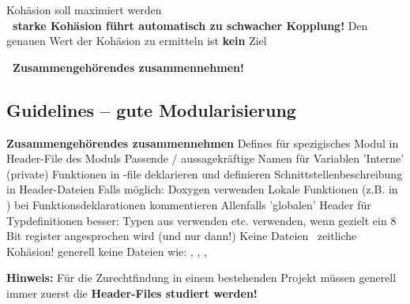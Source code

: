 \begin{outline}
    \1 Kohäsion soll maximiert werden \\
        \textbf{ \textrightarrow\ starke Kohäsion führt automatisch zu schwacher Kopplung!}
    \1 Den genauen Wert der Kohäsion zu ermitteln ist \textbf{kein} Ziel
\end{outline}

\vspace{0.1cm}

\textbf{ \textrightarrow\ Zusammengehörendes zusammennehmen!}


\subsection{Guidelines -- gute Modularisierung}

\begin{outline}
    \1 \textbf{Zusammengehörendes zusammennehmen}
        \2 Defines für spezigisches Modul in Header-File des Moduls
    \1 Passende / aussagekräftige Namen für Variablen
    \1 'Interne' (private) Funktionen in -file deklarieren und definieren
    \1 Schnittstellenbeschreibung in Header-Dateien
        \2 Falls möglich: Doxygen verwenden
    \1 Lokale Funktionen (z.B. in ) bei Funktionsdeklarationen kommentieren
    \1 Allenfalls 'globalen' Header für Typdefinitionen
        \2 besser: Typen aus  verwenden
    \1  etc. verwenden, wenn gezielt ein 8 Bit register angesprochen wird (und nur dann!)
    \1 Keine  Dateien \textrightarrow\ zeitliche Kohäsion!
        \2 generell keine Dateien wie: , , , 
\end{outline}

\vspace{0.2cm}

\textbf{Hinweis:} Für die Zurechtfindung in einem bestehenden Projekt müssen generell immer zuerst die \textbf{Header-Files studiert werden!}



